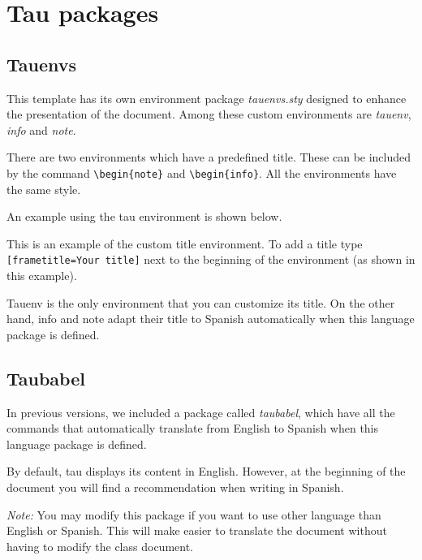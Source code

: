 \documentclass[9pt,a4paper,twocolumn,twoside]{tau-class/tau}
\begin{document}
\section{Tau packages}

    \subsection{Tauenvs}
	
        This template has its own environment package \textit{tauenvs.sty} designed to enhance the presentation of the document. Among these custom environments are \textit{tauenv}, \textit{info} and \textit{note}.
		
        There are two environments which have a predefined title. These can be included by the command \verb|\begin{note}| and \verb|\begin{info}|. All the environments have the same style.
			
        An example using the tau environment is shown below.
		
    	\begin{tauenv}[frametitle=Environment with custom title]
            This is an example of the custom title environment. To add a title type \verb|[frametitle=Your title]| next to the beginning of the environment (as shown in this example).
    	\end{tauenv}
		
        Tauenv is the only environment that you can customize its title. On the other hand, info and note adapt their title to Spanish automatically when this language package is defined.
		
    \subsection{Taubabel}

        In previous versions, we included a package called \textit{taubabel}, which have all the commands that automatically translate from English to Spanish when this language package is defined. 
        
        By default, tau displays its content in English. However, at the beginning of the document you will find a recommendation when writing in Spanish. 
		
        \textit{Note:} You may modify this package if you want to use other language than English or Spanish. This will make easier to translate the document without having to modify the class document.
		
\end{document}
